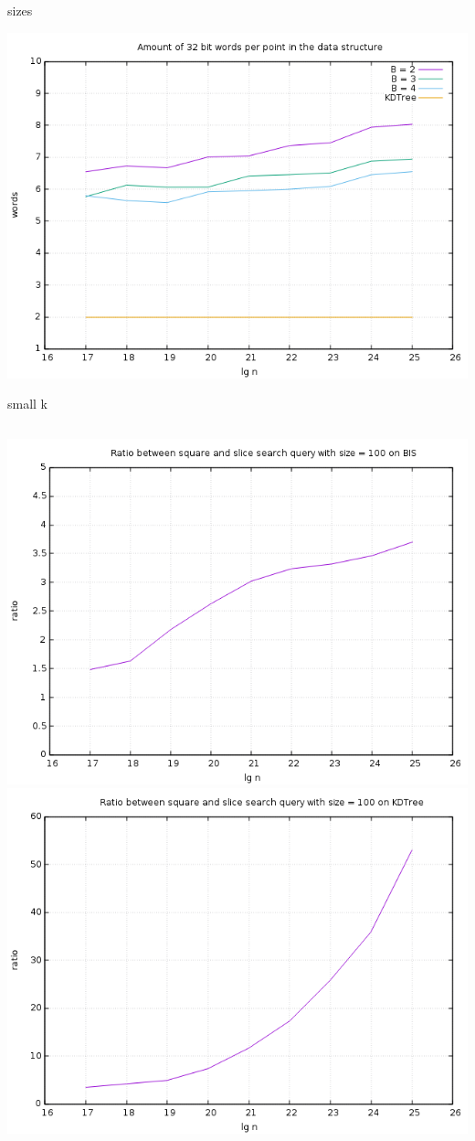 \documentclass[pdf]{beamer}
\begin{document}
\begin{frame}{sizes}
  \begin{center}
    \includegraphics[scale=0.35]{pictures/analysis/sizes.png}
  \end{center}
\end{frame}





\begin{frame}{small k}
  \begin{columns}
    \includegraphics[scale=0.35]{pictures/analysis/smalls/bis_ratio_100.png}
    \includegraphics[scale=0.35]{pictures/analysis/smalls/kdtree_ratio_100.png}
  \end{columns}
\end{frame}
\end{document}
